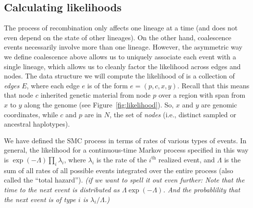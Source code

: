 \documentclass{article}
\newcommand{\comment}[1]{{\it \color{orange} (#1)}}
\begin{document}
\subsection{Calculating likelihoods} \label{par:liks}

The process of recombination only affects one lineage at a time
(and does not even depend on the state of other lineages).
On the other hand, coalescence events necessarily involve more than one lineage.
However, the asymmetric way we define coalescence above
allows us to uniquely associate each event with a single lineage,
which allows us to cleanly factor the likelihood across edges and nodes.
The data structure we will compute the likelihood of
is a collection of \emph{edges} $E$,
where each edge $e$ is of the form $e = (p,c,x,y)$.
Recall that this means that node $c$ inherited genetic material from node $p$
over a region with span from $x$ to $y$ along the genome
(see Figure~\ref{fig:likelihood}).
So, $x$ and $y$ are genomic coordinates,
while $c$ and $p$ are in $N$, the set of \emph{nodes}
(i.e., distinct sampled or ancestral haplotypes).

We have defined the SMC process in terms of rates of various types of events.
In general, the likelihood for a continuous-time Markov process specified in this way
is $\exp(-\Lambda) \prod_i \lambda_i$,
where $\lambda_i$ is the rate of the $i^\text{th}$ realized event,
and $\Lambda$ is the sum of all rates of all possible events
integrated over the entire process
(also called the ``total hazard''). \comment{if we want to spell it out even further:
Note that the time to the next event is distributed as $\Lambda \exp(-\Lambda)$. And
the probablility that the next event is of type $i$ is $\lambda_i / \Lambda$.}
\end{document}
